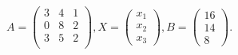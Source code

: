 \documentclass[12pt]{article}
\begin{document}
$ \begin{equation*}A=\begin{pmatrix}3 & 4 & 1 \\0 & 8 & 2 \\3 & 5 & 2 \\\end{pmatrix}, X=\begin{pmatrix}x_1 \\x_2 \\x_3\end{pmatrix}, B = \begin{pmatrix}16 \\14 \\8\end{pmatrix}.\end{equation*} $
\end{document}

